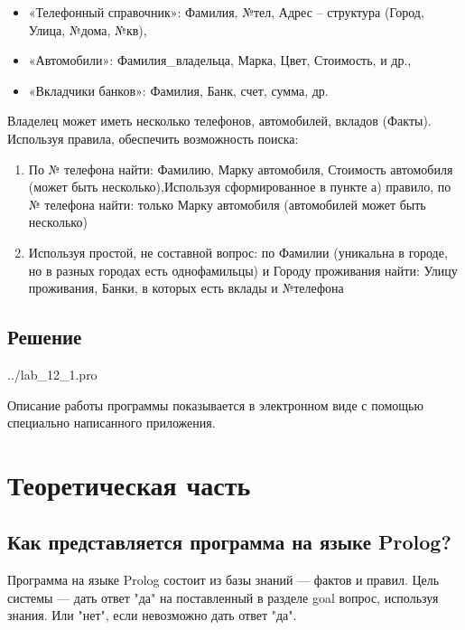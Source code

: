 \begin{itemize}
	\item «Телефонный справочник»: Фамилия, №тел, Адрес – структура (Город,
	Улица, №дома, №кв),
	\item «Автомобили»: Фамилия\_владельца, Марка, Цвет, Стоимость, и др.,
	\item «Вкладчики банков»: Фамилия, Банк, счет, сумма, др.
\end{itemize}
Владелец может иметь несколько телефонов, автомобилей, вкладов (Факты).
Используя правила, обеспечить возможность поиска:
\begin{enumerate}
	\item По № телефона найти: Фамилию, Марку автомобиля, Стоимость автомобиля
	(может быть несколько),Используя сформированное в пункте а) правило, по № телефона найти:
	только Марку автомобиля (автомобилей может быть несколько)
	\item Используя простой, не составной вопрос: по Фамилии (уникальна в городе, но в
	разных городах есть однофамильцы) и Городу проживания найти:
	Улицу
	проживания, Банки, в которых есть вклады и №телефона
\end{enumerate}

\subsection*{Решение}

\begin{lstinputlisting}[label=third,caption=Решение задания №3, language=lisp, firstline=0, lastline=41]{../lab_12_1.pro}
\end{lstinputlisting}

Описание работы программы показывается в электронном виде с помощью специально написанного приложения.


\section*{Теоретическая часть}

\subsection*{Как представляется программа на языке Prolog?}

Программа на языке Prolog состоит из базы знаний --- фактов и правил. Цель системы --- дать ответ "да"{} на поставленный в разделе goal вопрос, используя знания. Или "нет"{}, если невозможно дать ответ "да"{}.

